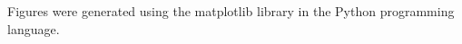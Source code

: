 \documentclass[12pt]{article}
\begin{document}


\begin{acknowledgment}
Figures were generated using the matplotlib library in the Python
programming language.
\end{acknowledgment}








{}
{\clearpage}


\end{document}

